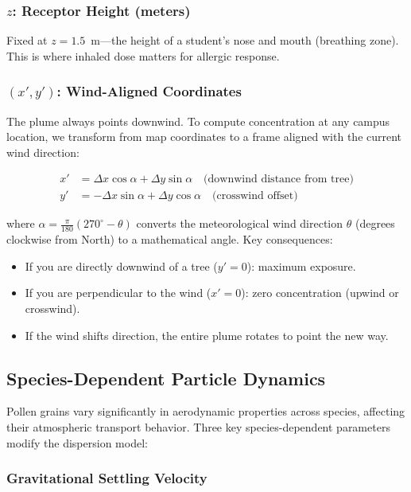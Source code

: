 \documentclass[11pt]{article}
\begin{document}
\subsubsection{$z$: Receptor Height (meters)}

Fixed at $z = 1.5$~m---the height of a student's nose and mouth (breathing zone). This is where inhaled dose matters for allergic response.

\subsubsection{$(x', y')$: Wind-Aligned Coordinates}

The plume always points downwind. To compute concentration at any campus location, we transform from map coordinates to a frame aligned with the current wind direction:

\begin{align}
x' &= \Delta x \cos\alpha + \Delta y \sin\alpha \quad \text{(downwind distance from tree)} \\
y' &= -\Delta x \sin\alpha + \Delta y \cos\alpha \quad \text{(crosswind offset)}
\end{align}

where $\alpha = \frac{\pi}{180}(270^\circ - \theta)$ converts the meteorological wind direction $\theta$ (degrees clockwise from North) to a mathematical angle. Key consequences:
\begin{itemize}
    \item If you are directly downwind of a tree ($y' = 0$): maximum exposure.
    \item If you are perpendicular to the wind ($x' = 0$): zero concentration (upwind or crosswind).
    \item If the wind shifts direction, the entire plume rotates to point the new way.
\end{itemize}


\subsection{Species-Dependent Particle Dynamics}

Pollen grains vary significantly in aerodynamic properties across species, affecting their atmospheric transport behavior. Three key species-dependent parameters modify the dispersion model:

\subsubsection{Gravitational Settling Velocity}
\end{document}
